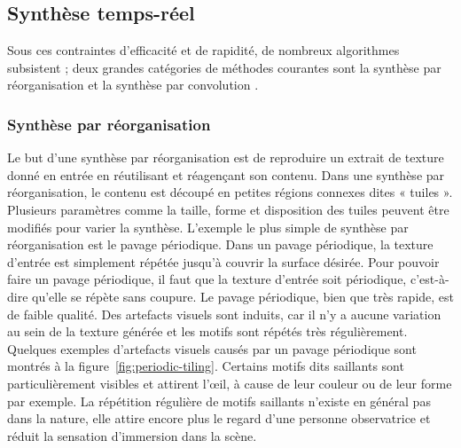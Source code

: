 \subsection*{Synthèse temps-réel} %

Sous ces contraintes d'efficacité et de rapidité, de nombreux algorithmes subsistent ; deux grandes catégories de méthodes courantes sont la synthèse \og par réorganisation \fg et la synthèse \og par convolution \fg.

\subsubsection{Synthèse par réorganisation}

Le but d'une synthèse par réorganisation est de reproduire un extrait de texture donné en entrée en réutilisant et réagençant son contenu. Dans une synthèse par réorganisation, le contenu est découpé en petites régions connexes dites « tuiles ». Plusieurs paramètres comme la taille, forme et disposition des tuiles peuvent être modifiés pour varier la synthèse. L'exemple le plus simple de synthèse par réorganisation est le pavage périodique. Dans un pavage périodique, la texture d'entrée est simplement répétée jusqu'à couvrir la surface désirée. Pour pouvoir faire un pavage périodique, il faut que la texture d'entrée soit périodique, c'est-à-dire qu'elle se répète sans coupure. Le pavage périodique, bien que très rapide, est de faible qualité. Des artefacts visuels sont induits, car il n'y a aucune variation au sein de la texture générée et les motifs sont répétés très régulièrement. Quelques exemples d'artefacts visuels causés par un pavage périodique sont montrés à la figure~\ref{fig:periodic-tiling}. Certains motifs dits \og saillants \fg sont particulièrement visibles et attirent l'œil, à cause de leur couleur ou de leur forme par exemple. La répétition régulière de motifs saillants n'existe en général pas dans la nature, elle attire encore plus le regard d'une personne observatrice et réduit la sensation d'immersion dans la scène.

\bigskip

